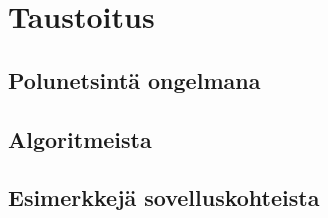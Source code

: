 \chapter{Taustoitus} \label{Taustoitus}
\section{Polunetsintä ongelmana}\label{pOngelmana}
\section{Algoritmeista}\label{algoritmeista}
\section{Esimerkkejä sovelluskohteista}\label{eSuovelluskohteista}
